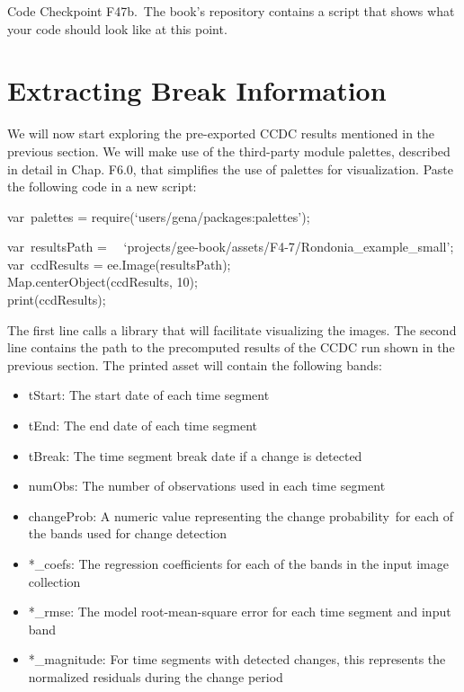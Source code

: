 \documentclass[
  letterpaper,
  DIV=11,
  numbers=noendperiod]{scrreprt}
\providecommand{\tightlist}{%
  \setlength{\itemsep}{0pt}\setlength{\parskip}{0pt}}\usepackage{longtable,booktabs,array}
\begin{document}
\begin{tcolorbox}[enhanced jigsaw, left=2mm, breakable, rightrule=.15mm, opacityback=0, colframe=quarto-callout-note-color-frame, colbacktitle=quarto-callout-note-color!10!white, arc=.35mm, opacitybacktitle=0.6, toptitle=1mm, colback=white, leftrule=.75mm, title=\textcolor{quarto-callout-note-color}{\faInfo}\hspace{0.5em}{Note}, toprule=.15mm, bottomtitle=1mm, titlerule=0mm, bottomrule=.15mm, coltitle=black]

Code Checkpoint F47b.~The book's repository contains a script that shows
what your code should look like at this point.

\end{tcolorbox}

\hypertarget{extracting-break-information}{%
\section{Extracting Break
Information}\label{extracting-break-information}}

We will now start exploring the pre-exported CCDC results mentioned in
the previous section. We will make use of the third-party module
palettes, described in detail in Chap. F6.0, that simplifies the use of
palettes for visualization. Paste the following code in a new script:

var~palettes = require(`users/gena/packages:palettes');

var~resultsPath =~
~`projects/gee-book/assets/F4-7/Rondonia\_example\_small';\\
var~ccdResults = ee.Image(resultsPath);\\
Map.centerObject(ccdResults, 10);\\
print(ccdResults);

The first line calls a library that will facilitate visualizing the
images. The second line contains the path to the precomputed results of
the CCDC run shown in the previous section. The printed asset will
contain the following bands:

\begin{itemize}
\tightlist
\item
  tStart: The start date of each time segment
\item
  tEnd: The end date of each time segment
\item
  tBreak: The time segment break date if a change is detected
\item
  numObs: The number of observations used in each time segment
\item
  changeProb: A numeric value representing the change probability~for
  each of the bands used for change detection
\item
  *\_coefs: The regression coefficients for each of the bands in the
  input image collection
\item
  *\_rmse: The model root-mean-square error for each time segment and
  input band
\item
  *\_magnitude: For time segments with detected changes, this represents
  the normalized residuals during the change period
\end{itemize}
\end{document}
